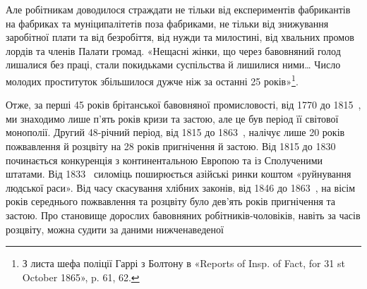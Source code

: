 \parcont{}  %
Але робітникам доводилося страждати не тільки від експериментів
фабрикантів на фабриках та муніципалітетів поза фабриками,
не тільки від знижування заробітної плати та від безробіття, від
нужди та милостині, від хвальних промов лордів та членів Палати
громад. «Нещасні жінки, що через бавовняний голод лишалися
без праці, стали покидьками суспільства й лишилися ними\dots{}
Число молодих проституток збільшилося дужче ніж за останні
25 років»\footnote{
З листа шефа поліції Гаррі з Болтону в «Reports of Insp. of Fact,
for 31 st October 1865», p. 61, 62.
}.

Отже, за перші 45 років брітанської бавовняної промисловості,
від 1770 до 1815~, ми знаходимо лише п’ять років кризи та застою,
але це був період її світової монополії. Другий 48-річний період,
від 1815 до 1863~, налічує лише 20 років пожвавлення
й розцвіту на 28 років пригнічення й застою. Від 1815 до 1830~
починається конкуренція з континентальною Европою та із
Сполученими штатами. Від 1833~ силоміць поширюється азійські
ринки коштом «руйнування людської раси». Від часу скасування
хлібних законів, від 1846 до 1863~, на вісім років середнього
пожвавлення та розцвіту було дев’ять років пригнічення
та застою. Про становище дорослих бавовняних робітників-чоловіків,
навіть за часів розцвіту, можна судити за даними нижченаведеної
